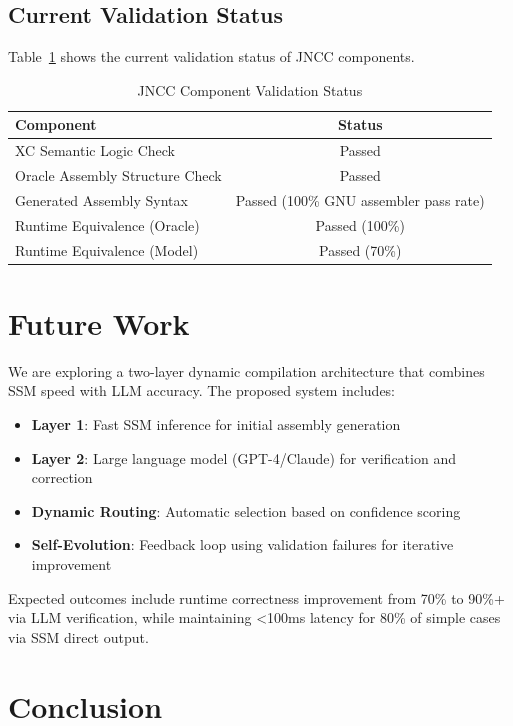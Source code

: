 \documentclass[12pt, a4paper, submitted, nofoot]{JNCCtemplate}
\begin{document}
\subsection{Current Validation Status}

Table~\ref{tab:status} shows the current validation status of JNCC components.

\begin{table}[h]
\centering
\caption{JNCC Component Validation Status}
\begin{tabular}{@{}lc@{}}
\toprule
\textbf{Component} & \textbf{Status} \\
\midrule
XC Semantic Logic Check & Passed \\
Oracle Assembly Structure Check & Passed \\
Generated Assembly Syntax & Passed (100\% GNU assembler pass rate) \\
Runtime Equivalence (Oracle) & Passed (100\%) \\
Runtime Equivalence (Model) & Passed (70\%) \\
\midrule
\end{tabular}
\label{tab:status}
\end{table}

\section{Future Work}

We are exploring a two-layer dynamic compilation architecture that combines SSM speed with LLM accuracy. The proposed system includes:

\begin{itemize}
    \item \textbf{Layer 1}: Fast SSM inference for initial assembly generation
    \item \textbf{Layer 2}: Large language model (GPT-4/Claude) for verification and correction
    \item \textbf{Dynamic Routing}: Automatic selection based on confidence scoring
    \item \textbf{Self-Evolution}: Feedback loop using validation failures for iterative improvement
\end{itemize}

Expected outcomes include runtime correctness improvement from 70\% to 90\%+ via LLM verification, while maintaining <100ms latency for 80\% of simple cases via SSM direct output.

\section{Conclusion}
\end{document}
